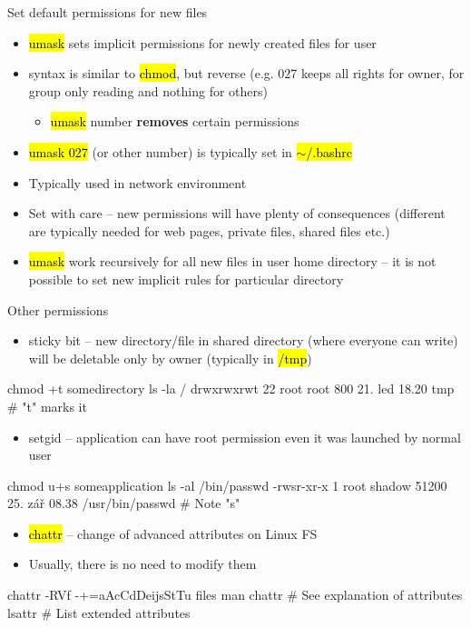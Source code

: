 \documentclass[compress, ucs, xelatex, 11pt, xcolor=svgnames,
  hyperref={
    bookmarks=true,
    unicode=true,
    colorlinks=true,
    pdftitle={Linux, command line and MetaCentrum},
    plainpages=false,
    pdfauthor={Vojtech Zeisek},
    pdfsubject={Course about use of Linux command line, writing shell scripts and using MetaCentrum of CESNET},
    pdfcreator={XeLaTeX},
    pdfkeywords={Linux, GNU, BASH, shell, command line, MetaCentrum},
    linkcolor=Red,
    anchorcolor=Blue,
    citecolor=Purple,
    filecolor=DodgerBlue,
    menucolor=DarkOrchid,
    urlcolor=DeepSkyBlue,
    pdftex},
  url={hyphens, lowtilde} %
  ]{beamer}
\renewcommand{\texttt}[1]{\hl{\ttfamily #1}}
\begin{document}
\begin{frame}{Set default permissions for new files}
\begin{itemize}
  \item \texttt{umask} sets implicit permissions for newly created files for user
  \item syntax is similar to \texttt{chmod}, but reverse (e.g. 027 keeps all rights for owner, for group only reading and nothing for others)
  \begin{itemize}
    \item \texttt{umask} number \textbf{removes} certain permissions
  \end{itemize}
  \item \texttt{umask 027} (or other number) is typically set in \texttt{$\sim$/.bashrc}
  \item Typically used in network environment
  \item Set with care -- new permissions will have plenty of consequences (different are typically needed for web pages, private files, shared files etc.)
  \item \texttt{umask} work recursively for all new files in user home directory -- it is not possible to set new implicit rules for particular directory
\end{itemize}
\end{frame}

\begin{frame}[fragile]{Other permissions}
\begin{itemize}
  \item sticky bit -- new directory/file in shared directory (where everyone can write) will be deletable only by owner (typically in \texttt{/tmp})
\end{itemize}
  \begin{bashcode}
    chmod +t somedirectory
    ls -la /
    drwxrwxrwt 22 root root 800 21. led 18.20 tmp # "t" marks it
  \end{bashcode}
\begin{itemize}
  \item setgid -- application can have root permission even it was launched by normal user
\end{itemize}
  \begin{bashcode}
    chmod u+s someapplication
    ls -al /bin/passwd
    -rwsr-xr-x 1 root shadow 51200 25. zář 08.38 /usr/bin/passwd # Note "s"
  \end{bashcode}
\begin{itemize}
  \item \texttt{chattr} -- change of advanced attributes on Linux FS
  \item Usually, there is no need to modify them
\end{itemize}
  \begin{bashcode}
    chattr -RVf -+=aAcCdDeijsStTu files
    man chattr # See explanation of attributes
    lsattr # List extended attributes
  \end{bashcode}
\end{frame}
\end{document}
